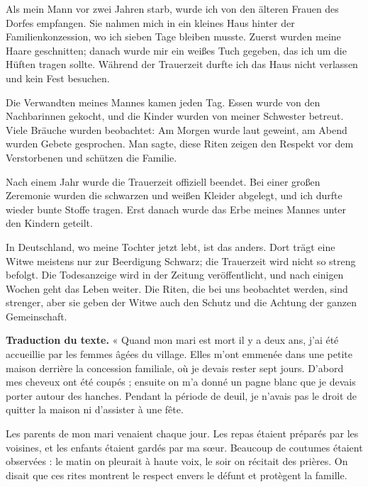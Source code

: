 \documentclass[11pt]{article}
\newcounter{popsec}
\newcounter{popsub}
\newcommand{\courssub}[1]{%
  \stepcounter{popsub}%
  \par\vspace{9pt}\noindent{\popxbold\fontsize{11.5}{13}\selectfont\color{popink}{\color{poporange}\thepopsec.\thepopsub}\hspace{6pt}#1}\par\nopagebreak\vspace{4pt}
}
\begin{document}
\courssub{Le texte support}

\begin{textebox}
Als mein Mann vor zwei Jahren starb, wurde ich von den älteren Frauen des Dorfes empfangen. Sie nahmen mich in ein kleines Haus hinter der Familienkonzession, wo ich sieben Tage bleiben musste. Zuerst wurden meine Haare geschnitten; danach wurde mir ein weißes Tuch gegeben, das ich um die Hüften tragen sollte. Während der Trauerzeit durfte ich das Haus nicht verlassen und kein Fest besuchen.

Die Verwandten meines Mannes kamen jeden Tag. Essen wurde von den Nachbarinnen gekocht, und die Kinder wurden von meiner Schwester betreut. Viele Bräuche wurden beobachtet: Am Morgen wurde laut geweint, am Abend wurden Gebete gesprochen. Man sagte, diese Riten zeigen den Respekt vor dem Verstorbenen und schützen die Familie.

Nach einem Jahr wurde die Trauerzeit offiziell beendet. Bei einer großen Zeremonie wurden die schwarzen und weißen Kleider abgelegt, und ich durfte wieder bunte Stoffe tragen. Erst danach wurde das Erbe meines Mannes unter den Kindern geteilt.

In Deutschland, wo meine Tochter jetzt lebt, ist das anders. Dort trägt eine Witwe meistens nur zur Beerdigung Schwarz; die Trauerzeit wird nicht so streng befolgt. Die Todesanzeige wird in der Zeitung veröffentlicht, und nach einigen Wochen geht das Leben weiter. Die Riten, die bei uns beobachtet werden, sind strenger, aber sie geben der Witwe auch den Schutz und die Achtung der ganzen Gemeinschaft.
\end{textebox}

\textbf{Traduction du texte.} « Quand mon mari est mort il y a deux ans, j'ai été accueillie par les femmes âgées du village. Elles m'ont emmenée dans une petite maison derrière la concession familiale, où je devais rester sept jours. D'abord mes cheveux ont été coupés ; ensuite on m'a donné un pagne blanc que je devais porter autour des hanches. Pendant la période de deuil, je n'avais pas le droit de quitter la maison ni d'assister à une fête.

Les parents de mon mari venaient chaque jour. Les repas étaient préparés par les voisines, et les enfants étaient gardés par ma sœur. Beaucoup de coutumes étaient observées : le matin on pleurait à haute voix, le soir on récitait des prières. On disait que ces rites montrent le respect envers le défunt et protègent la famille.
\end{document}
